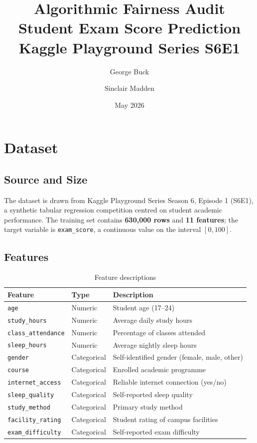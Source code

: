 \documentclass[12pt, letterpaper]{article}
\title{\textbf{Algorithmic Fairness Audit} \\[0.4em]
       \large Student Exam Score Prediction \\
       Kaggle Playground Series S6E1}
\author{George Buck \and Sinclair Madden}
\date{May 2026}
\begin{document}
\maketitle
\tableofcontents
\newpage

\section{Dataset}

\subsection{Source and Size}

The dataset is drawn from Kaggle Playground Series Season 6, Episode 1 (S6E1),
a synthetic tabular regression competition centred on student academic
performance. The training set contains \textbf{630,000 rows} and \textbf{11
features}; the target variable is \texttt{exam\_score}, a continuous value on
the interval $[0, 100]$.

\subsection{Features}

\begin{table}[H]
\centering
\caption{Feature descriptions}
\begin{tabular}{@{}llp{7cm}@{}}
\toprule
\textbf{Feature} & \textbf{Type} & \textbf{Description} \\
\midrule
\texttt{age}               & Numeric      & Student age (17--24) \\
\texttt{study\_hours}      & Numeric      & Average daily study hours \\
\texttt{class\_attendance} & Numeric      & Percentage of classes attended \\
\texttt{sleep\_hours}      & Numeric      & Average nightly sleep hours \\
\texttt{gender}            & Categorical  & Self-identified gender (female, male, other) \\
\texttt{course}            & Categorical  & Enrolled academic programme \\
\texttt{internet\_access}  & Categorical  & Reliable internet connection (yes/no) \\
\texttt{sleep\_quality}    & Categorical  & Self-reported sleep quality \\
\texttt{study\_method}     & Categorical  & Primary study method \\
\texttt{facility\_rating}  & Categorical  & Student rating of campus facilities \\
\texttt{exam\_difficulty}  & Categorical  & Self-reported exam difficulty \\
\bottomrule
\end{tabular}
\end{table}
\end{document}
